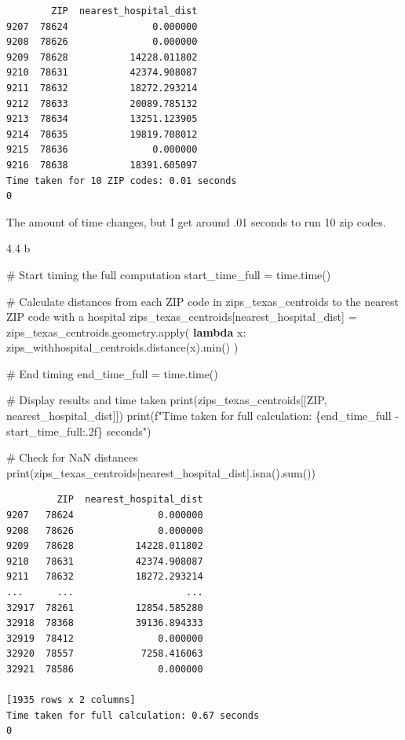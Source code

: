 \documentclass[
  letterpaper,
  DIV=11,
  numbers=noendperiod]{scrartcl}
\newenvironment{Shaded}{\begin{snugshade}}{\end{snugshade}}
\newcommand{\BuiltInTok}[1]{\textcolor[rgb]{0.00,0.23,0.31}{#1}}
\newcommand{\CommentTok}[1]{\textcolor[rgb]{0.37,0.37,0.37}{#1}}
\newcommand{\KeywordTok}[1]{\textcolor[rgb]{0.00,0.23,0.31}{\textbf{#1}}}
\newcommand{\NormalTok}[1]{\textcolor[rgb]{0.00,0.23,0.31}{#1}}
\newcommand{\OperatorTok}[1]{\textcolor[rgb]{0.37,0.37,0.37}{#1}}
\newcommand{\SpecialCharTok}[1]{\textcolor[rgb]{0.37,0.37,0.37}{#1}}
\newcommand{\SpecialStringTok}[1]{\textcolor[rgb]{0.13,0.47,0.30}{#1}}
\newcommand{\StringTok}[1]{\textcolor[rgb]{0.13,0.47,0.30}{#1}}
\begin{document}
\begin{verbatim}
        ZIP  nearest_hospital_dist
9207  78624               0.000000
9208  78626               0.000000
9209  78628           14228.011802
9210  78631           42374.908087
9211  78632           18272.293214
9212  78633           20089.785132
9213  78634           13251.123905
9214  78635           19819.708012
9215  78636               0.000000
9216  78638           18391.605097
Time taken for 10 ZIP codes: 0.01 seconds
0
\end{verbatim}

The amount of time changes, but I get around .01 seconds to run 10 zip
codes.

4.4 b

\begin{Shaded}
\begin{Highlighting}[]
\CommentTok{\# Start timing the full computation}
\NormalTok{start\_time\_full }\OperatorTok{=}\NormalTok{ time.time()}

\CommentTok{\# Calculate distances from each ZIP code in zips\_texas\_centroids to the nearest ZIP code with a hospital}
\NormalTok{zips\_texas\_centroids[}\StringTok{\textquotesingle{}nearest\_hospital\_dist\textquotesingle{}}\NormalTok{] }\OperatorTok{=}\NormalTok{ zips\_texas\_centroids.geometry.}\BuiltInTok{apply}\NormalTok{(}
    \KeywordTok{lambda}\NormalTok{ x: zips\_withhospital\_centroids.distance(x).}\BuiltInTok{min}\NormalTok{()}
\NormalTok{)}

\CommentTok{\# End timing}
\NormalTok{end\_time\_full }\OperatorTok{=}\NormalTok{ time.time()}

\CommentTok{\# Display results and time taken}
\BuiltInTok{print}\NormalTok{(zips\_texas\_centroids[[}\StringTok{\textquotesingle{}ZIP\textquotesingle{}}\NormalTok{, }\StringTok{\textquotesingle{}nearest\_hospital\_dist\textquotesingle{}}\NormalTok{]])}
\BuiltInTok{print}\NormalTok{(}\SpecialStringTok{f"Time taken for full calculation: }\SpecialCharTok{\{}\NormalTok{end\_time\_full }\OperatorTok{{-}}\NormalTok{ start\_time\_full}\SpecialCharTok{:.2f\}}\SpecialStringTok{ seconds"}\NormalTok{)}

\CommentTok{\# Check for NaN distances}
\BuiltInTok{print}\NormalTok{(zips\_texas\_centroids[}\StringTok{\textquotesingle{}nearest\_hospital\_dist\textquotesingle{}}\NormalTok{].isna().}\BuiltInTok{sum}\NormalTok{())}
\end{Highlighting}
\end{Shaded}

\begin{verbatim}
         ZIP  nearest_hospital_dist
9207   78624               0.000000
9208   78626               0.000000
9209   78628           14228.011802
9210   78631           42374.908087
9211   78632           18272.293214
...      ...                    ...
32917  78261           12854.585280
32918  78368           39136.894333
32919  78412               0.000000
32920  78557            7258.416063
32921  78586               0.000000

[1935 rows x 2 columns]
Time taken for full calculation: 0.67 seconds
0
\end{verbatim}
\end{document}
